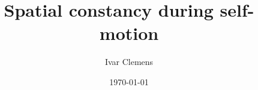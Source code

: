 \documentclass[10pt,a5paper,onecolumn]{book}
\begin{document}
\frontmatter
\title{Spatial constancy during self-motion}
\author{Ivar Clemens}
\date{\today}
\maketitle
\tableofcontents

\mainmatter






{}


\backmatter







\end{document}
